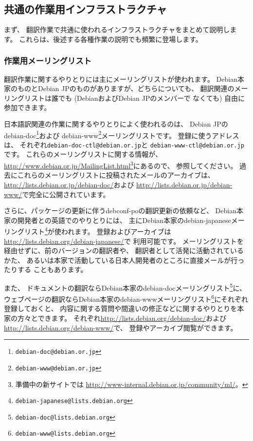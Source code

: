 \documentclass[mingoth,a4paper]{jsarticle}
\begin{document}
\subsection{共通の作業用インフラストラクチャ}

まず、
翻訳作業で共通に使われるインフラストラクチャをまとめて説明します。
これらは、後述する各種作業の説明でも頻繁に登場します。

\subsubsection{作業用メーリングリスト}

翻訳作業に関するやりとりには主にメーリングリストが使われます。
Debian本家のものとDebian JPのものがありますが、どちらについても、
翻訳関連のメーリングリストは誰でも (DebianおよびDebian JPのメンバーで
なくても) 自由に参加できます。

日本語訳関連の作業に関するやりとりによく使われるのは、
Debian JPのdebian-doc\footnote{\texttt{debian-doc@debian.or.jp}}および
debian-www\footnote{\texttt{debian-www@debian.or.jp}}メーリングリストです。
登録に使うアドレスは、
それぞれ\texttt{debian-doc-ctl@debian.or.jp}と
\texttt{debian-www-ctl@debian.or.jp}です。
これらのメーリングリストに関する情報が、
\url{http://www.debian.or.jp/MailingList.html}\footnote{%
準備中の新サイトでは
\url{http://www-internal.debian.or.jp/community/ml/}。}にあるので、
参照してください。
過去にこれらのメーリングリストに投稿されたメールのアーカイブは、
\url{http://lists.debian.or.jp/debian-doc/}および
\url{http://lists.debian.or.jp/debian-www/}で完全に公開されています。

さらに、パッケージの更新に伴うdebconf-poの翻訳更新の依頼など、
Debian本家の開発者との英語でのやりとりには、
主にDebian本家のdebian-japaneseメーリングリスト\footnote{%
\texttt{debian-japanese@lists.debian.org}}が使われます。
登録およびアーカイブは\url{http://lists.debian.org/debian-japanese/}で
利用可能です。
メーリングリストを経由せずに、前のバージョンの翻訳者や、
翻訳者として活発に活動されているかた、
あるいは本家で活動している日本人開発者のところに直接メールが行ったりする
こともあります。

また、
ドキュメントの翻訳ならDebian本家のdebian-docメーリングリスト\footnote{%
\texttt{debian-doc@lists.debian.org}}に、
ウェブページの翻訳ならDebian本家のdebian-wwwメーリングリスト\footnote{%
\texttt{debian-www@lists.debian.org}}にそれぞれ登録しておくと、
内容に関する質問や間違いの修正などに関するやりとりを本家の方々とできます。
それぞれ\url{http://lists.debian.org/debian-doc/}および
\url{http://lists.debian.org/debian-www/}で、
登録やアーカイブ閲覧ができます。
\end{document}

